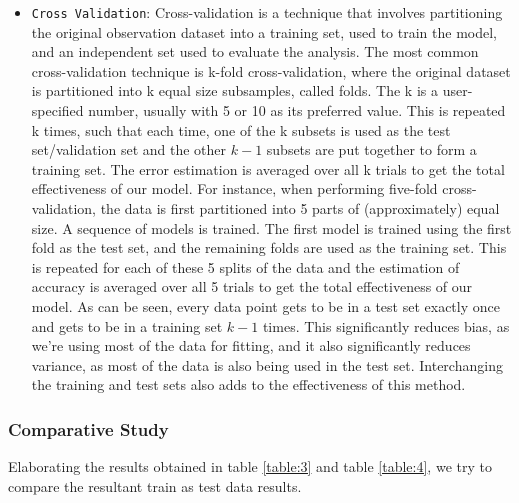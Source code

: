 \documentclass[12pt]{article}
\begin{document}
\begin{itemize}
\item
\texttt{Cross Validation}: Cross-validation is a technique that involves partitioning the original observation dataset into a training set, used to train the model, and an independent set used to evaluate the analysis. The most common cross-validation technique is k-fold cross-validation, where the original dataset is partitioned into k equal size subsamples, called folds. The k is a user-specified number, usually with 5 or 10 as its preferred value. This is repeated k times, such that each time, one of the k subsets is used as the test set/validation set and the other $k-1$ subsets are put together to form a training set. The error estimation is averaged over all k trials to get the total effectiveness of our model. For instance, when performing five-fold cross-validation, the data is first partitioned into 5 parts of (approximately) equal size. A sequence of models is trained. The first model is trained using the first fold as the test set, and the remaining folds are used as the training set. This is repeated for each of these 5 splits of the data and the estimation of accuracy is averaged over all 5 trials to get the total effectiveness of our model. As can be seen, every data point gets to be in a test set exactly once and gets to be in a training set $k-1$ times. This significantly reduces bias, as we’re using most of the data for fitting, and it also significantly reduces variance, as most of the data is also being used in the test set. Interchanging the training and test sets also adds to the effectiveness of this method.

\end{itemize}
\subsubsection{Comparative Study}
Elaborating the results obtained in table \ref{table:3} and table \ref{table:4}, we try to compare the resultant train as test data results.
\end{document}
